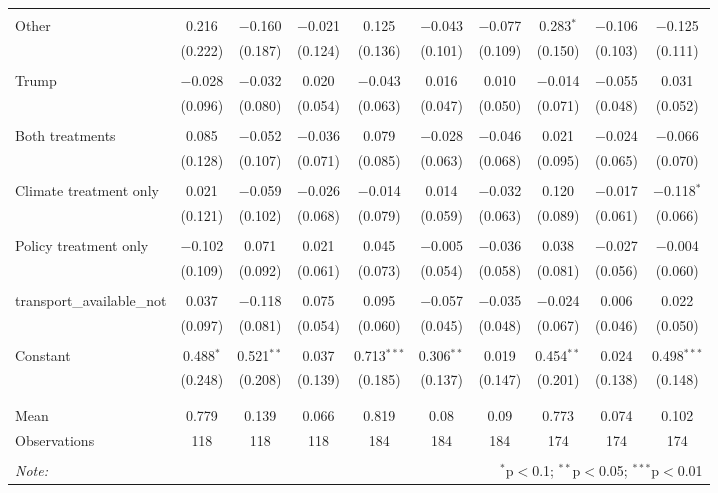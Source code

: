 \begin{tabular}{@{\extracolsep{5pt}}lccccccccc}
  & & & & & & & & & \\ 
 Other & 0.216 & $-$0.160 & $-$0.021 & 0.125 & $-$0.043 & $-$0.077 & 0.283$^{*}$ & $-$0.106 & $-$0.125 \\ 
  & (0.222) & (0.187) & (0.124) & (0.136) & (0.101) & (0.109) & (0.150) & (0.103) & (0.111) \\ 
  & & & & & & & & & \\ 
 Trump & $-$0.028 & $-$0.032 & 0.020 & $-$0.043 & 0.016 & 0.010 & $-$0.014 & $-$0.055 & 0.031 \\ 
  & (0.096) & (0.080) & (0.054) & (0.063) & (0.047) & (0.050) & (0.071) & (0.048) & (0.052) \\ 
  & & & & & & & & & \\ 
 Both treatments & 0.085 & $-$0.052 & $-$0.036 & 0.079 & $-$0.028 & $-$0.046 & 0.021 & $-$0.024 & $-$0.066 \\ 
  & (0.128) & (0.107) & (0.071) & (0.085) & (0.063) & (0.068) & (0.095) & (0.065) & (0.070) \\ 
  & & & & & & & & & \\ 
 Climate treatment only & 0.021 & $-$0.059 & $-$0.026 & $-$0.014 & 0.014 & $-$0.032 & 0.120 & $-$0.017 & $-$0.118$^{*}$ \\ 
  & (0.121) & (0.102) & (0.068) & (0.079) & (0.059) & (0.063) & (0.089) & (0.061) & (0.066) \\ 
  & & & & & & & & & \\ 
 Policy treatment only & $-$0.102 & 0.071 & 0.021 & 0.045 & $-$0.005 & $-$0.036 & 0.038 & $-$0.027 & $-$0.004 \\ 
  & (0.109) & (0.092) & (0.061) & (0.073) & (0.054) & (0.058) & (0.081) & (0.056) & (0.060) \\ 
  & & & & & & & & & \\ 
 transport\_available\_not & 0.037 & $-$0.118 & 0.075 & 0.095 & $-$0.057 & $-$0.035 & $-$0.024 & 0.006 & 0.022 \\ 
  & (0.097) & (0.081) & (0.054) & (0.060) & (0.045) & (0.048) & (0.067) & (0.046) & (0.050) \\ 
  & & & & & & & & & \\ 
 Constant & 0.488$^{*}$ & 0.521$^{**}$ & 0.037 & 0.713$^{***}$ & 0.306$^{**}$ & 0.019 & 0.454$^{**}$ & 0.024 & 0.498$^{***}$ \\ 
  & (0.248) & (0.208) & (0.139) & (0.185) & (0.137) & (0.147) & (0.201) & (0.138) & (0.148) \\ 
  & & & & & & & & & \\ 
\hline \\[-1.8ex] 
Mean & 0.779 & 0.139 & 0.066 & 0.819 & 0.08 & 0.09 & 0.773 & 0.074 & 0.102 \\ 
Observations & 118 & 118 & 118 & 184 & 184 & 184 & 174 & 174 & 174 \\ 
\hline 
\hline \\[-1.8ex] 
\textit{Note:}  & \multicolumn{9}{r}{$^{*}$p$<$0.1; $^{**}$p$<$0.05; $^{***}$p$<$0.01} \\ 
\end{tabular} 
